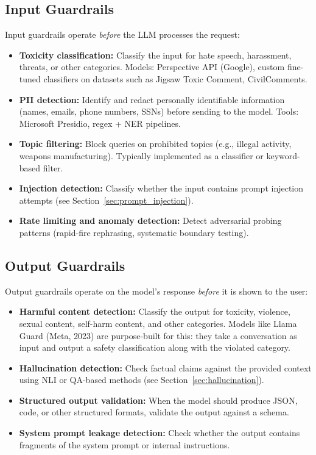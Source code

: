 \subsection{Input Guardrails}

Input guardrails operate \emph{before} the LLM processes the request:

\begin{itemize}
    \item \textbf{Toxicity classification:} Classify the input for hate speech,
    harassment, threats, or other categories.  Models: Perspective API
    (Google), custom fine-tuned classifiers on datasets such as Jigsaw Toxic
    Comment, CivilComments.
    \item \textbf{PII detection:} Identify and redact personally identifiable
    information (names, emails, phone numbers, SSNs) before sending to the model.
    Tools: Microsoft Presidio, regex + NER pipelines.
    \item \textbf{Topic filtering:} Block queries on prohibited topics (e.g.,
    illegal activity, weapons manufacturing).  Typically implemented as a
    classifier or keyword-based filter.
    \item \textbf{Injection detection:} Classify whether the input contains
    prompt injection attempts (see Section~\ref{sec:prompt_injection}).
    \item \textbf{Rate limiting and anomaly detection:} Detect adversarial
    probing patterns (rapid-fire rephrasing, systematic boundary testing).
\end{itemize}

\subsection{Output Guardrails}

Output guardrails operate on the model's response \emph{before} it is shown to
the user:

\begin{itemize}
    \item \textbf{Harmful content detection:} Classify the output for toxicity,
    violence, sexual content, self-harm content, and other categories.  Models
    like Llama Guard (Meta, 2023) are purpose-built for this: they take a
    conversation as input and output a safety classification along with the
    violated category.
    \item \textbf{Hallucination detection:} Check factual claims against the
    provided context using NLI or QA-based methods (see
    Section~\ref{sec:hallucination}).
    \item \textbf{Structured output validation:} When the model should produce
    JSON, code, or other structured formats, validate the output against a
    schema.
    \item \textbf{System prompt leakage detection:} Check whether the output
    contains fragments of the system prompt or internal instructions.
\end{itemize}

